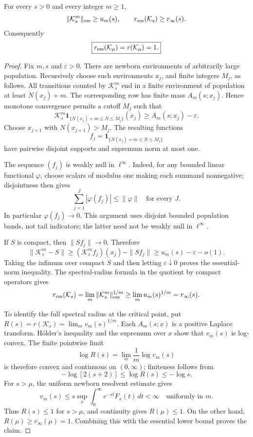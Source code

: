 \begin{theorem}\label{ess:radius}
For every $s>0$ and every integer $m\ge1$,
\[
 \|\mathcal K_s^m\|_{\rm ess}\ge u_m(s),
 \qquad
 r_{\rm ess}(\mathcal K_s)\ge r_\infty(s).
\]
Consequently
\[
 \boxed{r_{\rm ess}(\mathcal K_\mu)
       =r(\mathcal K_\mu)=1.}
\]
\end{theorem}
\begin{proof}
Fix $m,s$ and $\varepsilon>0$.  There are newborn environments of
arbitrarily large population.  Recursively choose such environments
$x_j$, and finite integers $M_j$, as follows.  All transitions counted
by $\mathcal K_s^m$ end in a finite environment of population at least
$N(x_j)+m$.  The corresponding row has finite mass
$A_m(s;x_j)$.  Hence monotone convergence permits a cutoff $M_j$ such
that
\[
 \mathcal K_s^m
 \mathbf1_{\{N(x_j)+m\le N\le M_j\}}(x_j)
 \ge A_m(s;x_j)-\varepsilon.
\]
Choose $x_{j+1}$ with $N(x_{j+1})>M_j$.  The resulting functions
\[
 f_j=\mathbf1_{\{N(x_j)+m\le N\le M_j\}}
\]
have pairwise disjoint supports and supremum norm at most one.

The sequence $(f_j)$ is weakly null in $\ell^\infty$.  Indeed, for
any bounded linear functional $\varphi$, choose scalars of modulus
one making each summand nonnegative; disjointness then gives
\[
 \sum_{j=1}^J|\varphi(f_j)|\le\|\varphi\|
 \quad\text{for every }J.
\]
In particular $\varphi(f_j)\to0$.  This argument uses disjoint bounded
population bands, not tail indicators; the latter need not be weakly
null in $\ell^\infty$.

If $S$ is compact, then $\|Sf_j\|\to0$.  Therefore
\[
 \|\mathcal K_s^m-S\|
 \ge (\mathcal K_s^mf_j)(x_j)-\|Sf_j\|
 \ge u_m(s)-\varepsilon-o(1).
\]
Taking the infimum over compact $S$ and then letting
$\varepsilon\downarrow0$ proves the essential-norm inequality.
The spectral-radius formula in the quotient by compact operators
gives
\[
 r_{\rm ess}(\mathcal K_s)
 =\lim_m\|\mathcal K_s^m\|_{\rm ess}^{1/m}
 \ge\lim_m u_m(s)^{1/m}=r_\infty(s).
\]

To identify the full spectral radius at the critical point, put
$R(s)=r(\mathcal K_s)=\lim_m v_m(s)^{1/m}$.  Each $A_m(s;x)$ is a
positive Laplace transform.  H\"older's inequality and the supremum
over $x$ show that $v_m(s)$ is log-convex.  The finite pointwise limit
\[
 \log R(s)=\lim_m\frac1m\log v_m(s)
\]
is therefore convex and continuous on $(0,\infty)$; finiteness follows
from
\[
 -\log[2(s+2)]\le\log R(s)\le-\log s.
\]
For $s>\mu$, the uniform newborn resolvent estimate gives
\[
 v_m(s)\le
 s\sup_x\int_0^\infty e^{-st}F_x(t)\,dt<\infty
 \quad\text{uniformly in }m.
\]
Thus $R(s)\le1$ for $s>\mu$, and continuity gives $R(\mu)\le1$.
On the other hand,
$R(\mu)\ge r_\infty(\mu)=1$.
Combining this with the essential lower bound proves the claim.
\end{proof}

